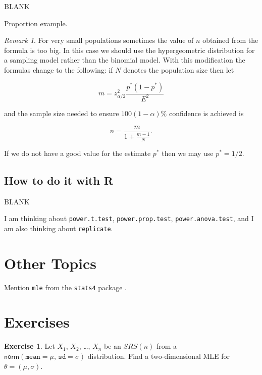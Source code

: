 \documentclass[]{book}
\numberwithin{equation}{chapter}
\numberwithin{figure}{chapter}
\theoremstyle{plain}
\theoremstyle{definition}
\newtheorem{xca}{Exercise}[chapter]
\theoremstyle{remark}
\theoremstyle{definition}
\theoremstyle{definition}
\theoremstyle{remark}
\newtheorem*{remark}{Remark}
\begin{document}
BLANK

Proportion example.

\bigskip

\begin{remark}
For very small populations sometimes the value of \(n\) obtained from
the formula is too big. In this case we should use the hypergeometric
distribution for a sampling model rather than the binomial model. With
this modification the formulas change to the following: if \(N\) denotes
the population size then let

\begin{equation}
m=z_{\alpha/2}^{2}\frac{p^{\ast}(1-p^{\ast})}{E^{2}}
\end{equation}

and the sample size needed to ensure \(100(1-\alpha)\%\) confidence is
achieved is

\begin{equation}
n=\frac{m}{1+\frac{m-1}{N}}.
\end{equation}

If we do not have a good value for the estimate \(p^{\ast}\) then we may
use \(p^{\ast}=1/2\).
\end{remark}

\subsection{How to do it with R}\label{how-to-do-it-with-r-38}

BLANK

I am thinking about \texttt{power.t.test}, \texttt{power.prop.test},
\texttt{power.anova.test}, and I am also thinking about
\texttt{replicate}.

\section{Other Topics}\label{sec-other-topics}

Mention \texttt{mle} from the \texttt{stats4} package \autocite{stats4}.

\section{Exercises}\label{exercises-6}

\begin{xca}
Let \(X_{1}\), \(X_{2}\), \ldots{}, \(X_{n}\) be an \(SRS(n)\) from a
\(\mathsf{norm}(\mathtt{mean} = \mu, \, \mathtt{sd} = \sigma)\)
distribution. Find a two-dimensional MLE for \(\theta=(\mu,\sigma)\).
\end{xca}
\end{document}

